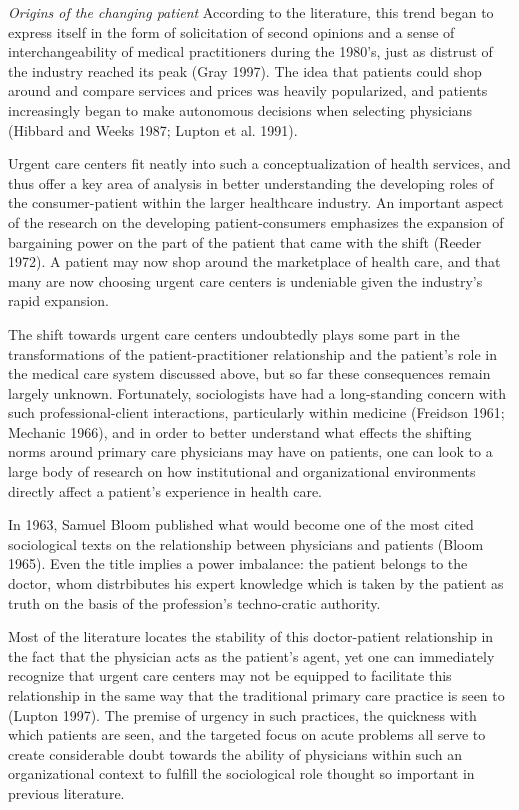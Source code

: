 \documentclass[12pt,twoside]{reedthesis}
\begin{document}
  \emph{Origins of the changing patient} According to the literature, this
  trend began to express itself in the form of solicitation of second
  opinions and a sense of interchangeability of medical practitioners
  during the 1980's, just as distrust of the industry reached its peak
  (Gray 1997). The idea that patients could shop around and compare
  services and prices was heavily popularized, and patients increasingly
  began to make autonomous decisions when selecting physicians (Hibbard
  and Weeks 1987; Lupton et al. 1991).
  
  Urgent care centers fit neatly into such a conceptualization of health
  services, and thus offer a key area of analysis in better understanding
  the developing roles of the consumer-patient within the larger
  healthcare industry. An important aspect of the research on the
  developing patient-consumers emphasizes the expansion of bargaining
  power on the part of the patient that came with the shift (Reeder 1972).
  A patient may now shop around the marketplace of health care, and that
  many are now choosing urgent care centers is undeniable given the
  industry's rapid expansion.
  
  The shift towards urgent care centers undoubtedly plays some part in the
  transformations of the patient-practitioner relationship and the
  patient's role in the medical care system discussed above, but so far
  these consequences remain largely unknown. Fortunately, sociologists
  have had a long-standing concern with such professional-client
  interactions, particularly within medicine (Freidson 1961; Mechanic
  1966), and in order to better understand what effects the shifting norms
  around primary care physicians may have on patients, one can look to a
  large body of research on how institutional and organizational
  environments directly affect a patient's experience in health care.
  
  In 1963, Samuel Bloom published what would become one of the most cited
  sociological texts on the relationship between physicians and patients
  (Bloom 1965). Even the title implies a power imbalance: the patient
  belongs to the doctor, whom distrbibutes his expert knowledge which is
  taken by the patient as truth on the basis of the profession's
  techno-cratic authority.
  
  Most of the literature locates the stability of this doctor-patient
  relationship in the fact that the physician acts as the patient's agent,
  yet one can immediately recognize that urgent care centers may not be
  equipped to facilitate this relationship in the same way that the
  traditional primary care practice is seen to (Lupton 1997). The premise
  of urgency in such practices, the quickness with which patients are
  seen, and the targeted focus on acute problems all serve to create
  considerable doubt towards the ability of physicians within such an
  organizational context to fulfill the sociological role thought so
  important in previous literature.
  
\end{document}
